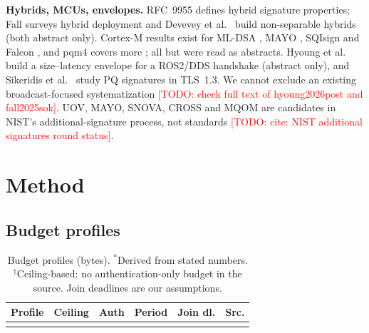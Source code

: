 \documentclass[conference]{IEEEtran}
\newcommand{\todo}[1]{\textcolor{red}{[TODO: #1]}}
\begin{document}
\textbf{Hybrids, MCUs, envelopes.} RFC~9955 \cite{bindel2026hybrid} defines
hybrid signature properties; Fall \cite{fall2025sok} surveys hybrid
deployment and Devevey et al.\ \cite{devevey2025compact} build non-separable
hybrids (both abstract only). Cortex-M results exist for ML-DSA
\cite{chhetri2026benchmarking}, MAYO \cite{gringiani2023mayo,bauer2026mayo},
SQIsign \cite{aardal2024optimized} and Falcon
\cite{pornin2025falcon,halmans2026flying}, and pqm4 covers more
\cite{nist2024pqm4}; all but \cite{chhetri2026benchmarking} were read as
abstracts. Hyoung et al.\ \cite{hyoung2026post} build a size--latency
envelope for a ROS2/DDS handshake (abstract only), and Sikeridis et al.\
\cite{sikeridis2020post} study PQ signatures in TLS~1.3. We cannot exclude
an existing broadcast-focused systematization \todo{check full text of
hyoung2026post and fall2025sok}. UOV, MAYO, SNOVA, CROSS and MQOM are
candidates in NIST's additional-signature process, not standards
\todo{cite: NIST additional signatures round status}.

\section{Method}
\label{sec:method}

\subsection{Budget profiles}

\begin{table}[t]
\centering
\caption{Budget profiles (bytes). $^*$Derived from stated numbers.
$^\dagger$Ceiling-based: no authentication-only budget in the source.
Join deadlines are our assumptions.}
\label{tab:profiles}
\setlength{\tabcolsep}{3pt}
\footnotesize
\begin{tabular}{@{}lrrlll@{}}
\toprule
Profile & Ceiling & Auth & Period & Join dl. & Src. \\
\midrule
\TabProfileRows
\bottomrule
\end{tabular}
\end{table}
\end{document}
